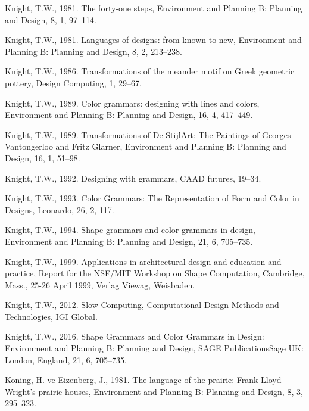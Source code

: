 \documentclass[12pt,turkish,a4paperpaper,]{report}
\begin{document}
\leavevmode\hypertarget{ref-Knight:1981gp}{}%
Knight, T.W., 1981. The forty-one steps, Environment and Planning B:
Planning and Design, 8, 1, 97--114.

\leavevmode\hypertarget{ref-Knight:1981ky}{}%
Knight, T.W., 1981. Languages of designs: from known to new, Environment
and Planning B: Planning and Design, 8, 2, 213--238.

\leavevmode\hypertarget{ref-Knight:1986wu}{}%
Knight, T.W., 1986. Transformations of the meander motif on Greek
geometric pottery, Design Computing, 1, 29--67.

\leavevmode\hypertarget{ref-Knight:1989ex}{}%
Knight, T.W., 1989. Color grammars: designing with lines and colors,
Environment and Planning B: Planning and Design, 16, 4, 417--449.

\leavevmode\hypertarget{ref-Knight:1989ec}{}%
Knight, T.W., 1989. Transformations of De StijlArt: The Paintings of
Georges Vantongerloo and Fritz Glarner, Environment and Planning B:
Planning and Design, 16, 1, 51--98.

\leavevmode\hypertarget{ref-Knight:1992tp}{}%
Knight, T.W., 1992. Designing with grammars, CAAD futures, 19--34.

\leavevmode\hypertarget{ref-Knight:1993jka}{}%
Knight, T.W., 1993. Color Grammars: The Representation of Form and Color
in Designs, Leonardo, 26, 2, 117.

\leavevmode\hypertarget{ref-Knight:1994hx}{}%
Knight, T.W., 1994. Shape grammars and color grammars in design,
Environment and Planning B: Planning and Design, 21, 6, 705--735.

\leavevmode\hypertarget{ref-Knight:1999uf}{}%
Knight, T.W., 1999. Applications in architectural design and education
and practice, Report for the NSF/MIT Workshop on Shape Computation,
Cambridge, Mass., 25-26 April 1999, Verlag Viewag, Weisbaden.

\leavevmode\hypertarget{ref-Knight:2012ue}{}%
Knight, T.W., 2012. Slow Computing, Computational Design Methods and
Technologies, IGI Global.

\leavevmode\hypertarget{ref-Saldana:2015wj}{}%
Knight, T.W., 2016. Shape Grammars and Color Grammars in Design:
Environment and Planning B: Planning and Design, SAGE PublicationsSage
UK: London, England, 21, 6, 705--735.

\leavevmode\hypertarget{ref-Koning:1981bd}{}%
Koning, H. ve Eizenberg, J., 1981. The language of the prairie: Frank
Lloyd Wright's prairie houses, Environment and Planning B: Planning and
Design, 8, 3, 295--323.
\end{document}
